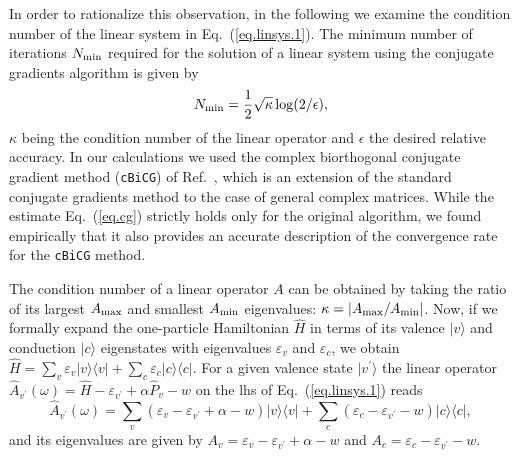 \documentclass[twocolumn,prb,showpacs,superscriptaddress]{revtex4}
\def\w{\omega}
\def\>{\rangle}
\def\<{\langle}
\def\H{\hat{H}}
\def\E{\varepsilon}
\def\vp{{v^\prime}}
\begin{document}
In order to rationalize this observation, in the following we examine
the condition number of the linear system in Eq.\ (\ref{eq.linsys.1}).
The minimum number of iterations $N_{\rm min}$ required for the solution of
a linear system using the conjugate gradients algorithm is given by
  \begin{equation}\label{eq.cg}
  N_{\rm min} = \frac{1}{2}\sqrt{\kappa} \log(2/\epsilon),
  \end{equation}
$\kappa$ being the condition number of the linear operator and $\epsilon$ the
desired relative accuracy.\cite{painless.cg} In our calculations we used the 
complex biorthogonal conjugate gradient method ({\tt cBiCG}) of Ref.\ ,
which is an extension of the standard conjugate gradients method to the 
case of general complex matrices. While the estimate Eq.\ (\ref{eq.cg}) strictly 
holds only for the original algorithm, we found empirically that it also 
provides an accurate description of the convergence rate for the {\tt cBiCG} 
method.

The condition number of a linear operator $A$ can be obtained by taking the ratio 
of its largest $A_{\rm max}$ and smallest $A_{\rm min}$ eigenvalues: 
$\kappa=|A_{\rm max}/A_{\rm min}|$.
Now, if we formally expand the one-particle Hamiltonian $\H$ in terms of its valence 
$|v\>$ and conduction $|c\>$ eigenstates with eigenvalues $\E_v$ and $\E_c$, we obtain
$\H = \sum_v \E_v |v\>\<v| + \sum_c \E_c |c\>\<c|$. For a given valence state 
$|v^\prime\>$ the linear operator $\hat{A}_\vp (\w) = \H - \E_\vp + \alpha \hat{P}_v - w$ 
on the lhs of Eq.\ (\ref{eq.linsys.1}) reads
  \begin{equation}
  \hat{A}_\vp (\w)  = 
  \sum_v ( \E_v - \E_\vp + \alpha - w ) |v\>\<v| 
  + \sum_c ( \E_c - \E_\vp - w ) |c\>\<c|,
  \end{equation}
and its eigenvalues are given by $A_v = \E_v - \E_\vp + \alpha - w$ and
$A_c = \E_c - \E_\vp - w$. 
\end{document}
